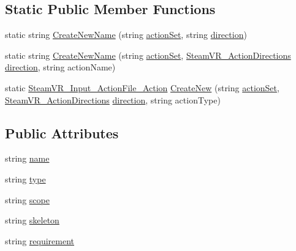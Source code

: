 \subsection*{Static Public Member Functions}
\begin{DoxyCompactItemize}
\item 
static string \mbox{\hyperlink{class_valve_1_1_v_r_1_1_steam_v_r___input___action_file___action_ac8aa08124febad10a50b8bd6900809bb}{Create\+New\+Name}} (string \mbox{\hyperlink{class_valve_1_1_v_r_1_1_steam_v_r___input___action_file___action_acd0651efa73a237482ac312f9ea5c6cb}{action\+Set}}, string \mbox{\hyperlink{class_valve_1_1_v_r_1_1_steam_v_r___input___action_file___action_ab4c2ef5c63a34662ee0d9c8f416ac8a8}{direction}})
\item 
static string \mbox{\hyperlink{class_valve_1_1_v_r_1_1_steam_v_r___input___action_file___action_adfeade80d8f06f3dd347429073bce7d5}{Create\+New\+Name}} (string \mbox{\hyperlink{class_valve_1_1_v_r_1_1_steam_v_r___input___action_file___action_acd0651efa73a237482ac312f9ea5c6cb}{action\+Set}}, \mbox{\hyperlink{namespace_valve_1_1_v_r_a1e6192cb5ddaf204afab87ccb5728780}{Steam\+V\+R\+\_\+\+Action\+Directions}} \mbox{\hyperlink{class_valve_1_1_v_r_1_1_steam_v_r___input___action_file___action_ab4c2ef5c63a34662ee0d9c8f416ac8a8}{direction}}, string action\+Name)
\item 
static \mbox{\hyperlink{class_valve_1_1_v_r_1_1_steam_v_r___input___action_file___action}{Steam\+V\+R\+\_\+\+Input\+\_\+\+Action\+File\+\_\+\+Action}} \mbox{\hyperlink{class_valve_1_1_v_r_1_1_steam_v_r___input___action_file___action_a6f8110f6855b3f2e0ee12fb8fe9bde34}{Create\+New}} (string \mbox{\hyperlink{class_valve_1_1_v_r_1_1_steam_v_r___input___action_file___action_acd0651efa73a237482ac312f9ea5c6cb}{action\+Set}}, \mbox{\hyperlink{namespace_valve_1_1_v_r_a1e6192cb5ddaf204afab87ccb5728780}{Steam\+V\+R\+\_\+\+Action\+Directions}} \mbox{\hyperlink{class_valve_1_1_v_r_1_1_steam_v_r___input___action_file___action_ab4c2ef5c63a34662ee0d9c8f416ac8a8}{direction}}, string action\+Type)
\end{DoxyCompactItemize}
\subsection*{Public Attributes}
\begin{DoxyCompactItemize}
\item 
string \mbox{\hyperlink{class_valve_1_1_v_r_1_1_steam_v_r___input___action_file___action_a9652b05c1e54c2544287b5bfe4b9a9f9}{name}}
\item 
string \mbox{\hyperlink{class_valve_1_1_v_r_1_1_steam_v_r___input___action_file___action_ad2083f8ee7013f92a22e75f7baf51bf5}{type}}
\item 
string \mbox{\hyperlink{class_valve_1_1_v_r_1_1_steam_v_r___input___action_file___action_adc74a98776d6edf88e31a61701d43fd8}{scope}}
\item 
string \mbox{\hyperlink{class_valve_1_1_v_r_1_1_steam_v_r___input___action_file___action_a170086146b7bf5285ab13c67ec877120}{skeleton}}
\item 
string \mbox{\hyperlink{class_valve_1_1_v_r_1_1_steam_v_r___input___action_file___action_a0b522a6067a3a6177c4280633e90b77a}{requirement}}
\end{DoxyCompactItemize}
